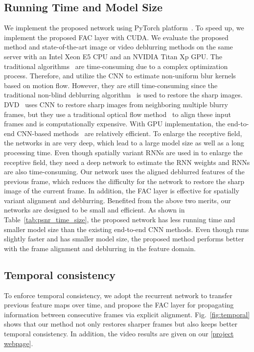 \documentclass[10pt,twocolumn,letterpaper]{article}
\begin{document}
\subsection{Running Time and Model Size}
We implement the proposed network using PyTorch platform~\cite{pytorch}.
To speed up, we implement the proposed FAC layer with CUDA.
We evaluate the proposed method and state-of-the-art image or video deblurring methods on the same server with an Intel Xeon E5 CPU and an NVIDIA Titan Xp GPU.
The traditional algorithms~\cite{whyte2012non, hyun2015generalized} are time-consuming due to a complex optimization process.
Therefore, \cite{sun2015learning} and \cite{gong2017motion} utilize the CNN to estimate non-uniform blur kernels based on motion flow.
However, they are still time-consuming since the traditional non-blind deblurring algorithm~\cite{zoran2011learning} is used to restore the sharp images.
DVD~\cite{su2017deep} uses CNN to restore sharp images from neighboring multiple blurry frames, but they use a traditional optical flow method~\cite{perez2013tv} to align these input frames and is computationally expensive.
With GPU implementation, the end-to-end CNN-based methods~\cite{nah2017deep, kupyn2018deblurgan, zhang2018dynamic, tao2018scale, hyun2017online} are relatively efficient.
To enlarge the receptive field, the networks in \cite{nah2017deep, kupyn2018deblurgan, zhang2018dynamic, tao2018scale} are very deep, which lead to a large model size as well as a long processing time.
Even though spatially variant RNNs are used in \cite{zhang2018dynamic} to enlarge the receptive field, they need a deep network to estimate the RNN weights and RNNs are also time-consuming.
Our network uses the aligned deblurred features of the previous frame, which reduces the difficulty for the network to restore the sharp image of the current frame.
In addition, the FAC layer is effective for spatially variant alignment and deblurring.
Benefited from the above two merits, our networks are designed to be small and efficient.
As shown in Table~\ref{tab:psnr_time_size}, the proposed network has less running time and smaller model size than the existing end-to-end CNN methods.
Even though \cite{hyun2017online} runs slightly faster and has smaller model size, the proposed method performs better with the frame alignment and deblurring in the feature domain.
\subsection{Temporal consistency}
To enforce temporal consistency, we adopt the recurrent network to transfer previous feature maps over time,
and propose the FAC layer for propagating information between consecutive frames via explicit alignment.
Fig.~\ref{fig:temporal} shows that our method not only restores sharper frames but also keeps better temporal consistency.
In addition, the video results are given on our [\href{https://shangchenzhou.com/projects/stfan/}{project webpage}].
\end{document}
